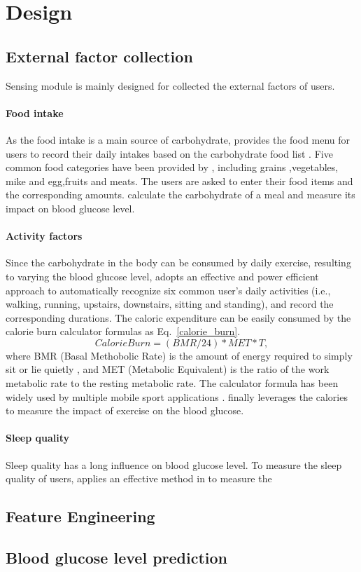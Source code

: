 
\section{Design}
\label{sec:design}

\subsection{External factor collection}
Sensing module is mainly designed for collected the external factors of users.

\paragraph{Food intake}
As the food intake is a main source of carbohydrate, \sysname provides the food menu for users to record their daily intakes based on the carbohydrate food list \cite{bib:carblist}.
Five common food categories have been provided by \sysname, including grains ,vegetables, mike and egg,fruits and meats. The users are asked to enter their food items and the corresponding amounts. \sysname calculate the carbohydrate of a meal and measure its impact on blood glucose level.

\paragraph{Activity factors}
Since the carbohydrate in the body can be consumed by daily exercise, resulting to varying the blood glucose level, \sysname adopts an effective and power efficient approach \cite{bib:kwapisz2011activity} to automatically recognize six common user's daily activities (i.e., walking, running, upstairs, downstairs, sitting and standing), and record the corresponding durations. The caloric expenditure can be easily consumed by the calorie burn calculator formulas as Eq.~\ref{calorie_burn}.
\begin{equation}\label{calorie_burn}
  Calorie Burn = (BMR/24)*MET*T,
\end{equation}
where BMR (Basal Methobolic Rate) is the amount of energy required to simply sit or lie quietly \cite{}, and MET (Metabolic Equivalent) is the ratio of the work metabolic rate to the resting metabolic rate\cite{}. The calculator formula has been widely used by multiple mobile sport applications \cite{}. 
\sysname finally leverages the calories to measure the impact of exercise on the blood glucose.

\paragraph{Sleep quality}
Sleep quality has a long influence on blood glucose level. To measure the sleep quality of users, \sysname applies an effective method in \cite{} to measure the 

\subsection{Feature Engineering}


\subsection{Blood glucose level prediction}
